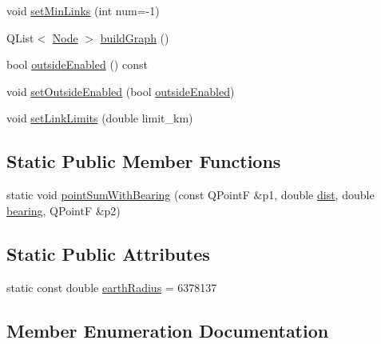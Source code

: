 \begin{DoxyCompactItemize}
\item 
void \mbox{\hyperlink{classdeprecated_1_1_graph_builder_ac921ad55d428014883d2c0d1244cd8ad}{set\+Min\+Links}} (int num=-\/1)
\item 
Q\+List$<$ \mbox{\hyperlink{classdeprecated_1_1_graph_builder_1_1_node}{Node}} $>$ \mbox{\hyperlink{classdeprecated_1_1_graph_builder_a2ea956db6733ec1c6853da8bb89e0a15}{build\+Graph}} ()
\item 
bool \mbox{\hyperlink{classdeprecated_1_1_graph_builder_ab4b68aa59d761cacb4661970b5a82adb}{outside\+Enabled}} () const
\item 
void \mbox{\hyperlink{classdeprecated_1_1_graph_builder_a776edd41b6cc789b1416374ee44db1cd}{set\+Outside\+Enabled}} (bool \mbox{\hyperlink{classdeprecated_1_1_graph_builder_ab4b68aa59d761cacb4661970b5a82adb}{outside\+Enabled}})
\item 
void \mbox{\hyperlink{classdeprecated_1_1_graph_builder_a29028252b97c092d304b55a03a54ba9d}{set\+Link\+Limits}} (double limit\+\_\+km)
\end{DoxyCompactItemize}
\subsection*{Static Public Member Functions}
\begin{DoxyCompactItemize}
\item 
static void \mbox{\hyperlink{classdeprecated_1_1_graph_builder_a3705b8282271d90fa56bb9731972c238}{point\+Sum\+With\+Bearing}} (const Q\+PointF \&p1, double \mbox{\hyperlink{my_rutils_8h_adce57df8ac5e5faa57d86a66535fdd92}{dist}}, double \mbox{\hyperlink{my_rutils_8h_a5859aabd9cf42a292d2b780000079170}{bearing}}, Q\+PointF \&p2)
\end{DoxyCompactItemize}
\subsection*{Static Public Attributes}
\begin{DoxyCompactItemize}
\item 
static const double \mbox{\hyperlink{classdeprecated_1_1_graph_builder_a16076357d9b569b4c2a0fb58b34774b0}{earth\+Radius}} = 6378137
\end{DoxyCompactItemize}


\subsection{Member Enumeration Documentation}
\mbox{\label{classdeprecated_1_1_graph_builder_a7f373eeb62c478a200ab1f3cfa4ef6f3}} 
